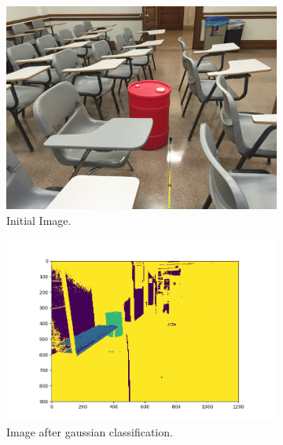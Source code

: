\documentclass[a4paper]{article}
\begin{document}
\begin{figure}[!tbp]
  \centering
  \begin{subfigure}[b]{.4\textwidth}
    \includegraphics[width=1\textwidth]{2_3.png}
    \caption{\label{fig:init_image}Initial Image.}
  \end{subfigure}
  \begin{subfigure}[b]{.4\textwidth}
    \includegraphics[width=1.3\textwidth]{segmented.png}
\caption{\label{fig:segmented_image}Image after gaussian classification.}
  \end{subfigure}
  \caption{\label{fig:first_set}}
\end{figure}
\end{document}
